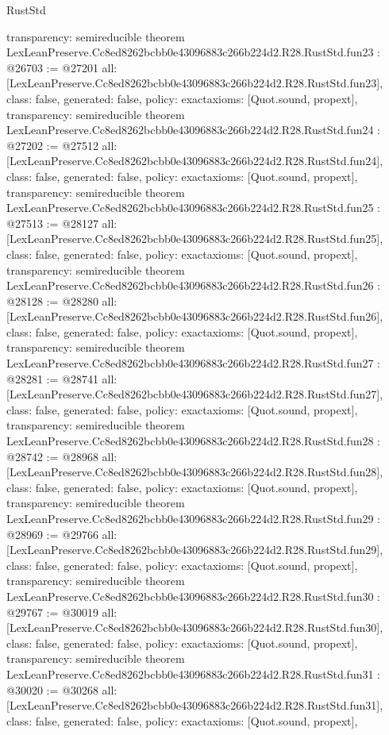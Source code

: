 \begin{lexlean}{RustStd}
\begin{coremodule}
{  transparency: semireducible
}
theorem LexLeanPreserve.Cc8ed8262bcbb0e43096883c266b224d2.R28.RustStd.fun23 : @26703 := @27201 {
  all: [LexLeanPreserve.Cc8ed8262bcbb0e43096883c266b224d2.R28.RustStd.fun23],
  class: false,
  generated: false,
  policy: exact{axioms: [Quot.sound, propext]},
  transparency: semireducible
}
theorem LexLeanPreserve.Cc8ed8262bcbb0e43096883c266b224d2.R28.RustStd.fun24 : @27202 := @27512 {
  all: [LexLeanPreserve.Cc8ed8262bcbb0e43096883c266b224d2.R28.RustStd.fun24],
  class: false,
  generated: false,
  policy: exact{axioms: [Quot.sound, propext]},
  transparency: semireducible
}
theorem LexLeanPreserve.Cc8ed8262bcbb0e43096883c266b224d2.R28.RustStd.fun25 : @27513 := @28127 {
  all: [LexLeanPreserve.Cc8ed8262bcbb0e43096883c266b224d2.R28.RustStd.fun25],
  class: false,
  generated: false,
  policy: exact{axioms: [Quot.sound, propext]},
  transparency: semireducible
}
theorem LexLeanPreserve.Cc8ed8262bcbb0e43096883c266b224d2.R28.RustStd.fun26 : @28128 := @28280 {
  all: [LexLeanPreserve.Cc8ed8262bcbb0e43096883c266b224d2.R28.RustStd.fun26],
  class: false,
  generated: false,
  policy: exact{axioms: [Quot.sound, propext]},
  transparency: semireducible
}
theorem LexLeanPreserve.Cc8ed8262bcbb0e43096883c266b224d2.R28.RustStd.fun27 : @28281 := @28741 {
  all: [LexLeanPreserve.Cc8ed8262bcbb0e43096883c266b224d2.R28.RustStd.fun27],
  class: false,
  generated: false,
  policy: exact{axioms: [Quot.sound, propext]},
  transparency: semireducible
}
theorem LexLeanPreserve.Cc8ed8262bcbb0e43096883c266b224d2.R28.RustStd.fun28 : @28742 := @28968 {
  all: [LexLeanPreserve.Cc8ed8262bcbb0e43096883c266b224d2.R28.RustStd.fun28],
  class: false,
  generated: false,
  policy: exact{axioms: [Quot.sound, propext]},
  transparency: semireducible
}
theorem LexLeanPreserve.Cc8ed8262bcbb0e43096883c266b224d2.R28.RustStd.fun29 : @28969 := @29766 {
  all: [LexLeanPreserve.Cc8ed8262bcbb0e43096883c266b224d2.R28.RustStd.fun29],
  class: false,
  generated: false,
  policy: exact{axioms: [Quot.sound, propext]},
  transparency: semireducible
}
theorem LexLeanPreserve.Cc8ed8262bcbb0e43096883c266b224d2.R28.RustStd.fun30 : @29767 := @30019 {
  all: [LexLeanPreserve.Cc8ed8262bcbb0e43096883c266b224d2.R28.RustStd.fun30],
  class: false,
  generated: false,
  policy: exact{axioms: [Quot.sound, propext]},
  transparency: semireducible
}
theorem LexLeanPreserve.Cc8ed8262bcbb0e43096883c266b224d2.R28.RustStd.fun31 : @30020 := @30268 {
  all: [LexLeanPreserve.Cc8ed8262bcbb0e43096883c266b224d2.R28.RustStd.fun31],
  class: false,
  generated: false,
  policy: exact{axioms: [Quot.sound, propext]},
}
\end{coremodule}
\end{lexlean}
